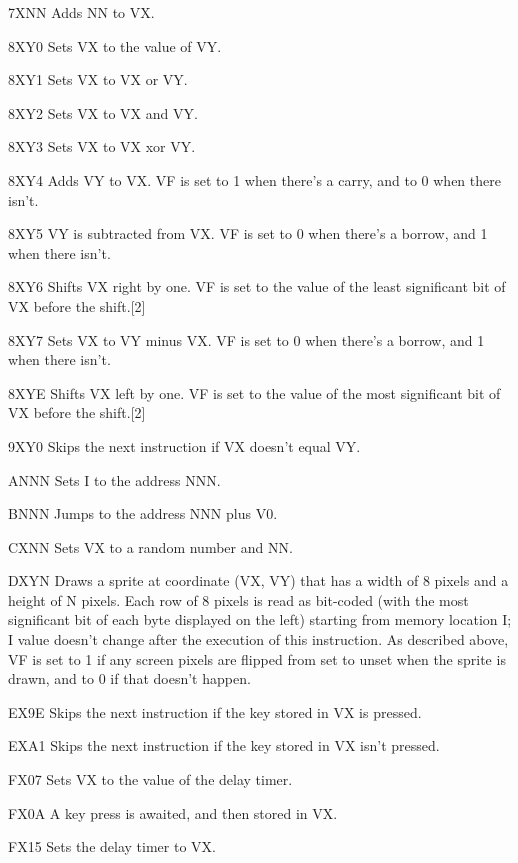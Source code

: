  7\-X\-N\-N Adds N\-N to V\-X. \par
 8\-X\-Y0 Sets V\-X to the value of V\-Y. \par
 8\-X\-Y1 Sets V\-X to V\-X or V\-Y. \par
 8\-X\-Y2 Sets V\-X to V\-X and V\-Y. \par
 8\-X\-Y3 Sets V\-X to V\-X xor V\-Y. \par
 8\-X\-Y4 Adds V\-Y to V\-X. V\-F is set to 1 when there's a carry, and to 0 when there isn't. \par
 8\-X\-Y5 V\-Y is subtracted from V\-X. V\-F is set to 0 when there's a borrow, and 1 when there isn't. \par
 8\-X\-Y6 Shifts V\-X right by one. V\-F is set to the value of the least significant bit of V\-X before the shift.\mbox{[}2\mbox{]} \par
 8\-X\-Y7 Sets V\-X to V\-Y minus V\-X. V\-F is set to 0 when there's a borrow, and 1 when there isn't. \par
 8\-X\-Y\-E Shifts V\-X left by one. V\-F is set to the value of the most significant bit of V\-X before the shift.\mbox{[}2\mbox{]} \par
 9\-X\-Y0 Skips the next instruction if V\-X doesn't equal V\-Y. \par
 A\-N\-N\-N Sets I to the address N\-N\-N. \par
 B\-N\-N\-N Jumps to the address N\-N\-N plus V0. \par
 C\-X\-N\-N Sets V\-X to a random number and N\-N. \par
 D\-X\-Y\-N Draws a sprite at coordinate (V\-X, V\-Y) that has a width of 8 pixels and a height of N pixels. Each row of 8 pixels is read as bit-\/coded (with the most significant bit of each byte displayed on the left) starting from memory location I; I value doesn't change after the execution of this instruction. As described above, V\-F is set to 1 if any screen pixels are flipped from set to unset when the sprite is drawn, and to 0 if that doesn't happen. \par
 E\-X9\-E Skips the next instruction if the key stored in V\-X is pressed. \par
 E\-X\-A1 Skips the next instruction if the key stored in V\-X isn't pressed. \par
 F\-X07 Sets V\-X to the value of the delay timer.\par
 F\-X0\-A A key press is awaited, and then stored in V\-X. \par
 F\-X15 Sets the delay timer to V\-X. \par
